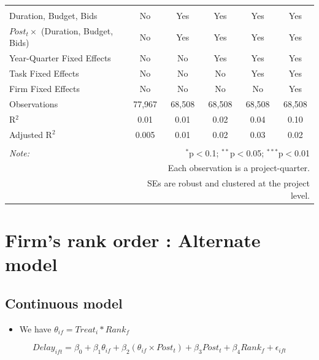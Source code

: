 \documentclass[
]{article}
\providecommand{\tightlist}{%
  \setlength{\itemsep}{0pt}\setlength{\parskip}{0pt}}
\begin{document}
\begin{table}[H]
\begin{tabular}{@{\extracolsep{-2pt}}lccccc}
  & & & & & \\ 
\hline \\[-1.8ex] 
Duration, Budget, Bids & No & Yes & Yes & Yes & Yes \\ 
$Post_t \times$  (Duration, Budget, Bids) & No & Yes & Yes & Yes & Yes \\ 
Year-Quarter Fixed Effects & No & No & Yes & Yes & Yes \\ 
Task Fixed Effects & No & No & No & Yes & Yes \\ 
Firm Fixed Effects & No & No & No & No & Yes \\ 
Observations & 77,967 & 68,508 & 68,508 & 68,508 & 68,508 \\ 
R$^{2}$ & 0.01 & 0.01 & 0.02 & 0.04 & 0.10 \\ 
Adjusted R$^{2}$ & 0.005 & 0.01 & 0.02 & 0.03 & 0.02 \\ 
\hline 
\hline \\[-1.8ex] 
\textit{Note:}  & \multicolumn{5}{r}{$^{*}$p$<$0.1; $^{**}$p$<$0.05; $^{***}$p$<$0.01} \\ 
 & \multicolumn{5}{r}{Each observation is a project-quarter.} \\ 
 & \multicolumn{5}{r}{SEs are robust and clustered at the project level.} \\ 
\end{tabular} 
\end{table}

\hypertarget{firms-rank-order-alternate-model}{%
\section{Firm's rank order : Alternate
model}\label{firms-rank-order-alternate-model}}

\hypertarget{continuous-model}{%
\subsection{Continuous model}\label{continuous-model}}

\begin{itemize}
\tightlist
\item
  We have \(\theta_{if} = Treat_i * Rank_f\)
\end{itemize}

\[ Delay_{ift} = \beta_0 + \beta_1 \theta_{if} + \beta_2 (\theta_{if} \times Post_t) + \beta_3 Post_t + \beta_4 Rank_f + \epsilon_{ift} \]
\end{document}
